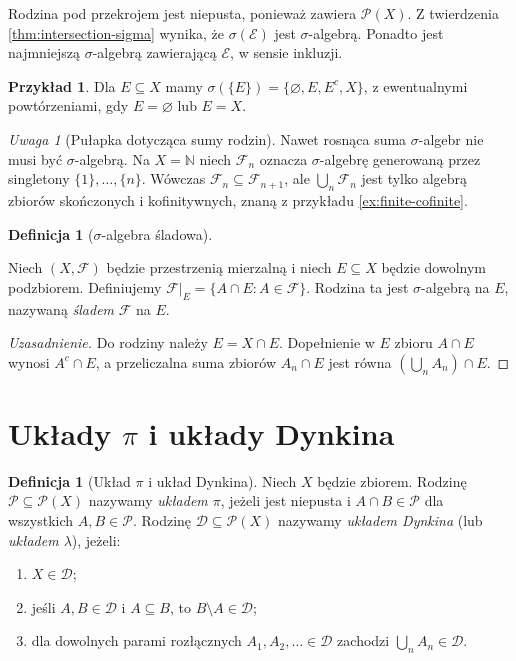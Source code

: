 \documentclass[11pt,a4paper,oneside]{book}
\numberwithin{equation}{chapter}
\theoremstyle{plain}
\theoremstyle{definition}
\newtheorem{definicja}[twierdzenie]{Definicja}
\newtheorem{przyklad}[twierdzenie]{Przykład}
\theoremstyle{remark}
\newtheorem{uwaga}[twierdzenie]{Uwaga}
\begin{document}
Rodzina pod przekrojem jest niepusta, ponieważ zawiera $\mathcal P(X)$.
Z twierdzenia \ref{thm:intersection-sigma} wynika, że $\sigma(\mathcal E)$
jest $\sigma$-algebrą. Ponadto jest najmniejszą $\sigma$-algebrą
zawierającą $\mathcal E$, w sensie inkluzji.

\begin{przyklad}
Dla $E\subseteq X$ mamy
$\sigma(\{E\})=\{\varnothing,E,E^c,X\}$, z ewentualnymi powtórzeniami,
gdy $E=\varnothing$ lub $E=X$.
\end{przyklad}

\begin{uwaga}[Pułapka dotycząca sumy rodzin]
Nawet rosnąca suma $\sigma$-algebr nie musi być $\sigma$-algebrą.
Na $X=\mathbb N$ niech $\mathcal F_n$ oznacza $\sigma$-algebrę
generowaną przez singletony $\{1\},\ldots,\{n\}$.
Wówczas $\mathcal F_n\subseteq\mathcal F_{n+1}$, ale
$\bigcup_n\mathcal F_n$ jest tylko algebrą zbiorów skończonych i
kofinitywnych, znaną z przykładu \ref{ex:finite-cofinite}.
\end{uwaga}

\begin{definicja}[$\sigma$-algebra śladowa]\label{idx:01:definicja:04}

Niech $(X,\mathcal F)$ będzie przestrzenią mierzalną i niech
$E\subseteq X$ będzie dowolnym podzbiorem. Definiujemy
$\mathcal F|_E=\{A\cap E:A\in\mathcal F\}$.
Rodzina ta jest $\sigma$-algebrą na $E$, nazywaną \emph{śladem}
$\mathcal F$ na $E$.
\end{definicja}
\begin{proof}[Uzasadnienie]
Do rodziny należy $E=X\cap E$. Dopełnienie w $E$ zbioru $A\cap E$
wynosi $A^c\cap E$, a przeliczalna suma zbiorów $A_n\cap E$ jest równa
$(\bigcup_n A_n)\cap E$.
\end{proof}

\section{Układy \texorpdfstring{$\pi$}{pi} i układy Dynkina}

\begin{definicja}[Układ $\pi$ i układ Dynkina]
\label{def:pi-lambda}
Niech $X$ będzie zbiorem. Rodzinę $\mathcal P\subseteq\mathcal P(X)$
nazywamy \emph{układem $\pi$}, jeżeli jest niepusta i
$A\cap B\in\mathcal P$ dla wszystkich $A,B\in\mathcal P$.
Rodzinę $\mathcal D\subseteq\mathcal P(X)$ nazywamy \emph{układem
Dynkina} (lub \emph{układem $\lambda$}), jeżeli:
\begin{enumerate}
\item $X\in\mathcal D$;
\item jeśli $A,B\in\mathcal D$ i $A\subseteq B$, to $B\setminus A\in\mathcal D$;
\item dla dowolnych parami rozłącznych $A_1,A_2,\ldots\in\mathcal D$
zachodzi $\bigcup_nA_n\in\mathcal D$.
\end{enumerate}
\end{definicja}
\end{document}
